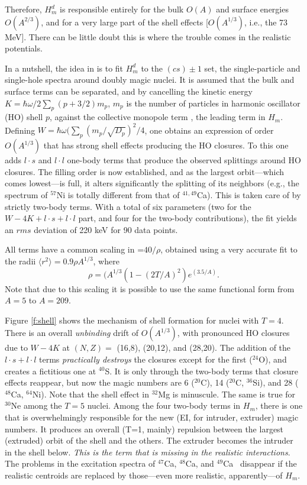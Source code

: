 \begin{multicols}{2}
Therefore, $H_m^d$ is responsible entirely for the bulk $O(A)$ and surface
energies $O(A^{2/3})$, and for a very large part of the shell effects
[$O(A^{1/3})$, i.e., the 73 MeV]. There can be little doubt this is
where the trouble comes in the realistic potentials.

In a nutshell, the idea in \cite{dz98} is to fit $H_m^d$ to the
$(cs)\pm 1$ set, the single-particle and single-hole spectra around
doubly magic nuclei. It is assumed that the bulk and surface terms can be
separated, and by cancelling the kinetic energy
\mbox{$K=\hbar\omega/2\sum_p {(p+3/2)m_p}$}, $m_p$ is the number of
particles in harmonic oscillator (HO) shell $p$, against  the
collective monopole term \cite{mdz,jdz95}, the leading term in $H_m$.
Defining \mbox{$W=\hbar\omega(\sum_p{(m_p/\sqrt{D_p})^2}/4$}, one obtains an
expression of order $O(A^{1/3})$ that has strong shell effects
producing the HO closures. To this one adds $l\cdot s$ and $l\cdot l$
one-body terms that produce the observed splittings around HO
closures. The filling order is now established, and as the largest
orbit---which comes lowest---is full, it alters significantly the
splitting of its neighbors (e.g.,
the spectrum of $^{57}$Ni is totally
different from that of $^{41,49}$Ca). This is taken care of by
strictly two-body terms. With a total of six parameters (two for the
$W-4K+l\cdot s+l\cdot l$ part, and four for the two-body
contributions), the fit yields an $rms$
deviation of 220 keV for 90 data points.

All terms have a common scaling in \hw=$40/\rho$, obtained using a
very accurate fit to the radii $\langle r^2\rangle =0.9\rho A^{1/3}$,
where
\begin{equation}
\label{rho}
\rho=(A^{1/3}(1-(2T/A)^2)e^{(3.5/A)}.
\end{equation}
Note that due to this scaling it is possible to use the
same functional form from $A=5$ to $A=209$.

Figure \ref{f:shell} shows the mechanism of shell formation for nuclei
with $T=4$. There is an overall {\em unbinding} drift of $O(A^{1/3})$,
with pronounced HO closures due to $W-4K$ at $(N,Z)=$ (16,8), (20,12),
and (28,20). The addition of the $l\cdot s+l\cdot l$ terms {\em
  practically
destroys} the closures except for the first ($^{24}$O),
and creates a fictitious one at $^{40}$S. It is only through the two-body
terms that closure effects
reappear, but now the magic numbers are 6 ($^{20}$C), 14 ($^{20}$C,
$^{36}$Si), and 28 ($^{48}$Ca,
$^{64}$Ni). Note that the shell effect
in $^{32}$Mg is minuscule. The same is true for
$^{30}$Ne among the $T=5$ nuclei.
Among the four two-body terms in $H_m$, there is one that is
overwhelmingly responsible for the new (EI, for intruder, extruder)
magic numbers.  It produces an overall (T=1, mainly) repulsion between
the largest (extruded) orbit of the shell and the others. The extruder
becomes the intruder in the shell below. {\em This is the term that is
missing in the realistic interactions}.
The problems in the excitation spectra of $^{47}$Ca, $^{48}$Ca, and
$^{49}$Ca~\cite{pasquini,hko95} disappear if the realistic centroids
are replaced by those---even more realistic, apparently---of $H_m$.


\end{multicols}
